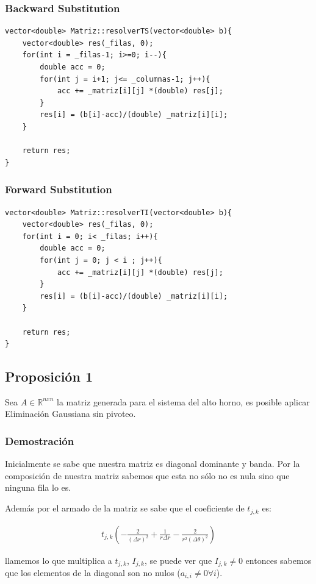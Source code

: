 \documentclass[12pt,a4paper]{article}
\begin{document}
\subsubsection{Backward Substitution}
\begin{lstlisting}
vector<double> Matriz::resolverTS(vector<double> b){
	vector<double> res(_filas, 0);
	for(int i = _filas-1; i>=0; i--){
		double acc = 0;
		for(int j = i+1; j<= _columnas-1; j++){
			acc += _matriz[i][j] *(double) res[j];
        }
		res[i] = (b[i]-acc)/(double) _matriz[i][i];
	}
	
	return res;
}
\end{lstlisting}

\subsubsection{Forward Substitution}
\begin{lstlisting}
vector<double> Matriz::resolverTI(vector<double> b){
	vector<double> res(_filas, 0);
	for(int i = 0; i< _filas; i++){
		double acc = 0;
		for(int j = 0; j < i ; j++){
			acc += _matriz[i][j] *(double) res[j];
        }
		res[i] = (b[i]-acc)/(double) _matriz[i][i];
	}
	
	return res;
}
\end{lstlisting}

\subsection{Proposición 1}
Sea $A \in \mathds{R}^{nxn}$ la matriz generada para el sistema del alto horno, es posible aplicar Eliminación Gaussiana sin pivoteo.

\subsubsection{Demostración}
Inicialmente se sabe que nuestra matriz es diagonal dominante y banda. Por la composición de nuestra matriz sabemos que esta no sólo no es nula sino que ninguna fila lo es.

Además por el armado de la matriz se sabe que el coeficiente de $t_{j,k}$ es:

\begin{align*}
t_{j,k}(- \frac{2}{(\Delta r)^2} + \frac{1}{r \Delta r} - \frac{2}{r^2 (\Delta \theta)^2})
\end{align*}

llamemos lo que multiplica a  $t_{j,k}$, $I_{j,k}$, se puede ver que $I_{j,k} \neq 0$ entonces sabemos que los elementos de la diagonal son no nulos ($a_{i,i} \neq 0 \forall i$).
\end{document}
